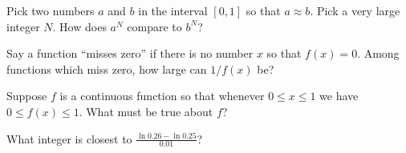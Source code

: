 \documentclass{ximera}
\begin{document}
\begin{shuffle}
\begin{problem}
  Pick two numbers $a$ and $b$ in the interval $[0,1]$ so that
  $a \approx b$.  Pick a very large integer $N$.  How does $a^N$
  compare to $b^N$?
  \begin{multipleChoice}
  \end{multipleChoice}
\end{problem}

\begin{problem}
  Say a function ``misses zero'' if there is no number $x$ so that
  $f(x) = 0$.  Among functions which miss zero, how large can $1/f(x)$
  be?
  \begin{multipleChoice}
  \end{multipleChoice}
\end{problem}

\begin{problem}
  Suppose $f$ is a continuous function so that whenever $0 \leq x \leq 1$ we have $0 \leq f(x) \leq 1$.  What must be true about $f$?
  \begin{multipleChoice}
  \end{multipleChoice}
\end{problem}



\begin{problem}
  What integer is closest to $\frac{\ln 0.26 - \ln 0.25}{0.01}$?
  \begin{multipleChoice}
  \end{multipleChoice}
\end{problem}


\end{shuffle}
\end{document}
